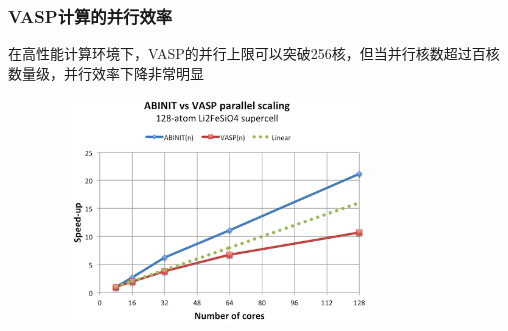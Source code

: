 %

\frame
{
	\frametitle{\textrm{VASP}计算的并行效率}
	在高性能计算环境下，\textrm{VASP}的并行上限可以突破\textrm{256}核，但当并行核数超过百核数量级，并行效率下降非常明显
\begin{figure}[h!]
	\vspace{-0.10in}
\centering
\includegraphics[height=2.35in,width=3.55in,viewport=0 0 240 180,clip]{Figures/VASP-abinit_Li128-1.png}
\label{ABINIT_vs_VASP-2}
\end{figure} 
}

